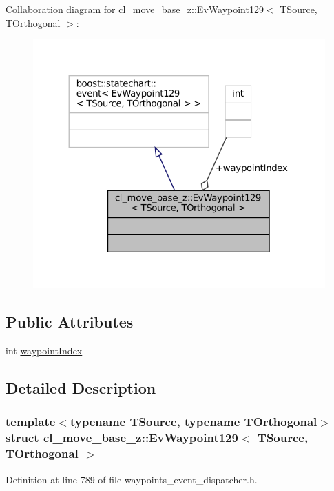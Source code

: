 Collaboration diagram for cl\+\_\+move\+\_\+base\+\_\+z\+:\+:Ev\+Waypoint129$<$ T\+Source, T\+Orthogonal $>$\+:
\nopagebreak
\begin{figure}[H]
\begin{center}
\leavevmode
\includegraphics[width=324pt]{structcl__move__base__z_1_1EvWaypoint129__coll__graph}
\end{center}
\end{figure}
\subsection*{Public Attributes}
\begin{DoxyCompactItemize}
\item 
int \hyperlink{structcl__move__base__z_1_1EvWaypoint129_af41f02bb4065061654a521d88b1f459e}{waypoint\+Index}
\end{DoxyCompactItemize}


\subsection{Detailed Description}
\subsubsection*{template$<$typename T\+Source, typename T\+Orthogonal$>$\newline
struct cl\+\_\+move\+\_\+base\+\_\+z\+::\+Ev\+Waypoint129$<$ T\+Source, T\+Orthogonal $>$}



Definition at line 789 of file waypoints\+\_\+event\+\_\+dispatcher.\+h.



